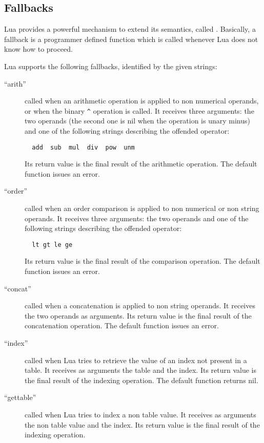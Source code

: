 \subsection{Fallbacks} \label{fallback}

Lua provides a powerful mechanism to extend its semantics,
called .
Basically, a fallback is a programmer defined function
which is called whenever Lua does not know how to proceed.

Lua supports the following fallbacks,
identified by the given strings:
\begin{description}
\item[``arith'']
called when an arithmetic operation is applied to non numerical operands,
or when the binary \verb'^' operation is called.
It receives three arguments:
the two operands (the second one is nil when the operation is unary minus)
and one of the following strings describing the offended operator:
\begin{verbatim}
  add  sub  mul  div  pow  unm
\end{verbatim}
Its return value is the final result of the arithmetic operation.
The default function issues an error.
\item[``order'']
called when an order comparison is applied to non numerical or
non string operands.
It receives three arguments:
the two operands and
one of the following strings describing the offended operator:
\begin{verbatim}
  lt gt le ge
\end{verbatim}
Its return value is the final result of the comparison operation.
The default function issues an error.
\item[``concat'']
called when a concatenation is applied to non string operands.
It receives the two operands as arguments.
Its return value is the final result of the concatenation operation.
The default function issues an error.
\item[``index'']
called when Lua tries to retrieve the value of an index
not present in a table.
It receives as arguments the table and the index.
Its return value is the final result of the indexing operation.
The default function returns nil.
\item[``gettable'']
called when Lua tries to index a non table value.
It receives as arguments the non table value and the index.
Its return value is the final result of the indexing operation.

\end{description}
